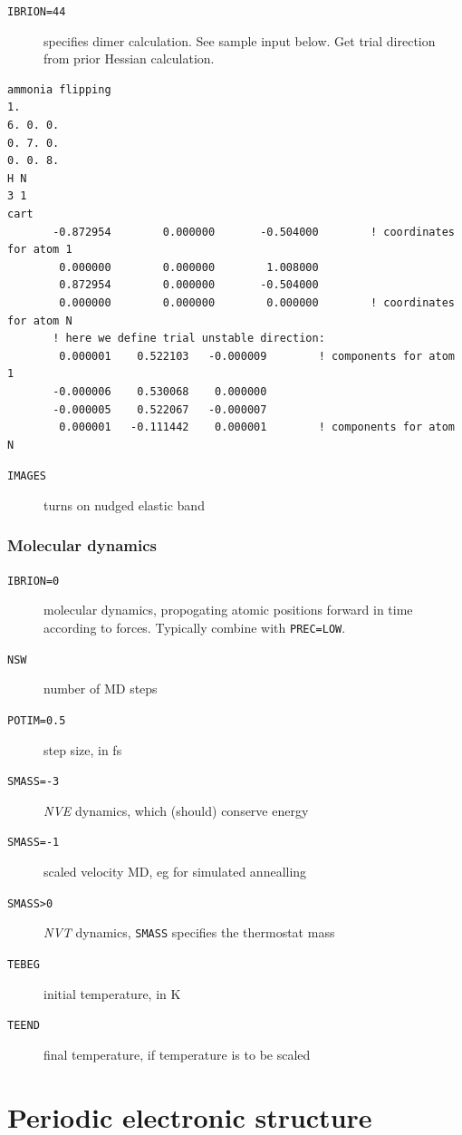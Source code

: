 \documentclass[11pt]{article}
\begin{document}
\begin{description}
\item[{\texttt{IBRION=44}}] specifies dimer calculation.  See sample input below.  Get trial direction from prior Hessian calculation.
\end{description}
\begin{verbatim}
ammonia flipping
1.
6. 0. 0.
0. 7. 0.
0. 0. 8.
H N
3 1
cart
       -0.872954        0.000000       -0.504000        ! coordinates for atom 1
        0.000000        0.000000        1.008000
        0.872954        0.000000       -0.504000
        0.000000        0.000000        0.000000        ! coordinates for atom N
       ! here we define trial unstable direction:
        0.000001    0.522103   -0.000009        ! components for atom 1
       -0.000006    0.530068    0.000000
       -0.000005    0.522067   -0.000007
        0.000001   -0.111442    0.000001        ! components for atom N
\end{verbatim}

\begin{description}
\item[{\texttt{IMAGES}}] turns on nudged elastic band
\end{description}
\subsubsection{Molecular dynamics}
\label{sec:orgc6733f4}
\begin{description}
\item[{\texttt{IBRION=0}}] molecular dynamics, propogating atomic positions forward in time according to forces.  Typically combine with \texttt{PREC=LOW}.
\item[{\texttt{NSW}}] number of MD steps
\item[{\texttt{POTIM=0.5}}] step size, in fs
\item[{\texttt{SMASS=-3}}] \emph{NVE} dynamics, which (should) conserve energy
\item[{\texttt{SMASS=-1}}] scaled velocity MD, eg for simulated annealling
\item[{\texttt{SMASS>0}}] \emph{NVT} dynamics, \texttt{SMASS} specifies the thermostat mass
\item[{\texttt{TEBEG}}] initial temperature, in K
\item[{\texttt{TEEND}}] final temperature, if temperature is to be scaled
\end{description}
\newpage

\section{Periodic electronic structure}
\label{sec:orgd15835a}
\end{document}
